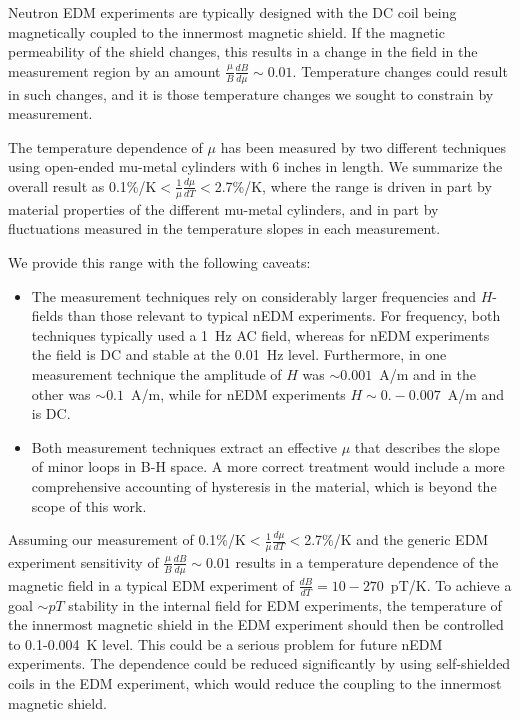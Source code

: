 \documentclass[review]{elsarticle}
\begin{document}
Neutron EDM experiments are typically designed with the DC coil being
magnetically coupled to the innermost magnetic shield.  If the
magnetic permeability of the shield changes, this results in a change
in the field in the measurement region by an amount
$\frac{\mu}{B}\frac{dB}{d\mu}\sim 0.01$.  Temperature changes could
result in such changes, and it is those temperature changes we sought
to constrain by measurement.

The temperature dependence of $\mu$ has been measured by two different
techniques using open-ended mu-metal cylinders with 6 inches in
length.  We summarize the overall result as
0.1\%/K$<\frac{1}{\mu}\frac{d\mu}{dT}<$2.7\%/K, where the range is
driven in part by material properties of the different mu-metal
cylinders, and in part by fluctuations measured in the temperature
slopes in each measurement.

We provide this range with the following caveats:
\begin{itemize}
\item The measurement techniques rely on considerably larger
  frequencies and $H$-fields than those relevant to typical nEDM
  experiments.  For frequency, both techniques typically used a 1~Hz
  AC field, whereas for nEDM experiments the field is DC and stable at
  the 0.01~Hz level.  Furthermore, in one measurement technique the
  amplitude of $H$ was $\sim 0.001$~A/m and in the other was $\sim 0.1$~A/m,
  while for nEDM experiments $H\sim 0.-0.007$~A/m and is DC.
\item Both measurement techniques extract an effective $\mu$ that
  describes the slope of minor loops in B-H space.  A more correct
  treatment would include a more comprehensive accounting of
  hysteresis in the material, which is beyond the scope of this work.
\end{itemize}


Assuming our measurement of
0.1\%/K$<\frac{1}{\mu}\frac{d\mu}{dT}<$2.7\%/K and the generic EDM
experiment sensitivity of $\frac{\mu}{B}\frac{dB}{d\mu}\sim 0.01$
results in a temperature dependence of the magnetic field in a typical
EDM experiment of $\frac{dB}{dT}=10-270$~pT/K.  To achieve a goal
$\sim pT$ stability in the internal field for EDM experiments, the
temperature of the innermost magnetic shield in the EDM experiment
should then be controlled to 0.1-0.004~K level.  This could be a
serious problem for future nEDM experiments.  The dependence could be
reduced significantly by using self-shielded coils in the EDM
experiment, which would reduce the coupling to the innermost magnetic
shield.
\end{document}
